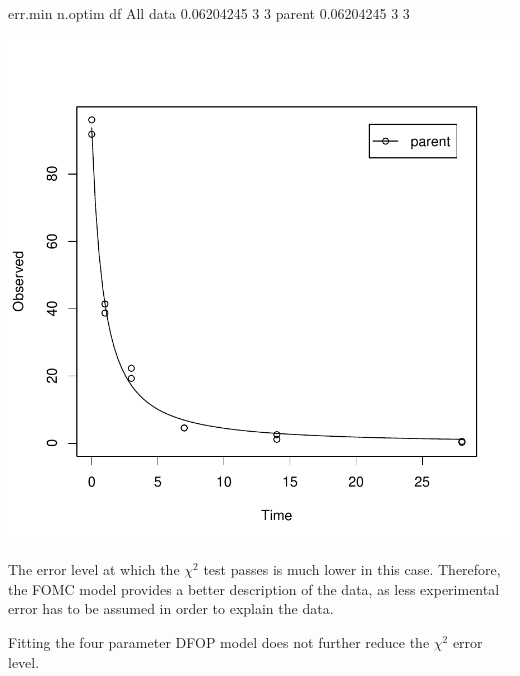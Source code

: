 \documentclass[12pt,a4paper]{article}
\begin{document}
\begin{Schunk}
\begin{Soutput}
            err.min n.optim df
All data 0.06204245       3  3
parent   0.06204245       3  3
\end{Soutput}
\end{Schunk}
\includegraphics{examples-L2_FOMC}

The error level at which the $\chi^2$ test passes is much lower in this case.
Therefore, the FOMC model provides a better description of the data, as less
experimental error has to be assumed in order to explain the data.

Fitting the four parameter DFOP model does not further reduce the 
$\chi^2$ error level. 
\end{document}
